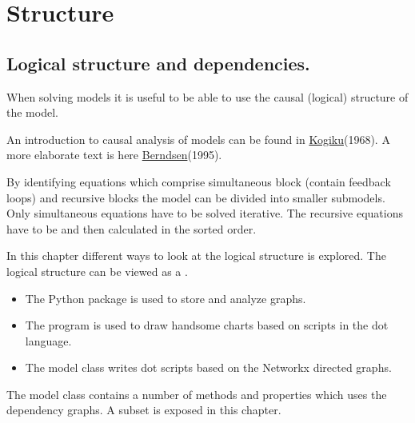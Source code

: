 \documentclass[letterpaper,10pt,english]{jupyterBook}
\begin{document}
\part{Structure}

\sphinxstepscope


\chapter{Logical structure and dependencies.}
\label{\detokenize{content/howto/structure/Logical_structure:logical-structure-and-dependencies}}\label{\detokenize{content/howto/structure/Logical_structure::doc}}
\sphinxAtStartPar
When solving models it is useful to be able to use the causal (logical) structure of the model.

\sphinxAtStartPar
An introduction to causal analysis of models can be found in \hyperlink{cite.content/litterature:id4}{Kogiku}(1968). A more elaborate text is here \hyperlink{cite.content/litterature:id2}{Berndsen}(1995).

\sphinxAtStartPar
By identifying equations which comprise simultaneous block (contain feedback loops) and recursive
blocks the model can be divided into smaller sub\sphinxhyphen{}models. Only simultaneous equations have to be solved iterative. The recursive equations have to be  and then calculated in the sorted order.

\sphinxAtStartPar
In this chapter different ways to look at the logical structure is explored. 
The logical structure can be viewed as a .
\begin{itemize}
\item {} 
\sphinxAtStartPar
The Python package  is used to store and analyze graphs.

\item {} 
\sphinxAtStartPar
The program  is used to draw handsome charts based on scripts in the dot language.

\item {} 
\sphinxAtStartPar
The model class writes dot scripts based on the Networkx directed graphs.

\end{itemize}

\sphinxAtStartPar
The model class contains a number of methods and properties which uses the dependency graphs. A subset is exposed in this chapter.
\end{document}
